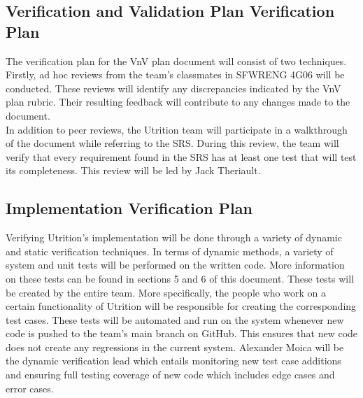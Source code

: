 \documentclass[12pt, titlepage]{article}
\begin{document}
	\subsection{Verification and Validation Plan Verification Plan}
	
	
	
	
	The verification plan for the VnV plan document will consist of two techniques. Firstly, ad hoc reviews from the team's classmates in SFWRENG 4G06 will be conducted. These reviews will identify any discrepancies indicated by the VnV plan rubric. Their resulting feedback will contribute to any changes made to the document.\\
	
	In addition to peer reviews, the Utrition team will participate in a walkthrough of the document while referring to the SRS. During this review, the team will verify that every requirement found in the SRS has at least one test that will test its completeness. This review will be led by Jack Theriault. 
	
	\subsection{Implementation Verification Plan}
	
	
	
	Verifying Utrition's implementation will be done through a variety of dynamic and static verification techniques. In terms of dynamic methods, a variety of system and unit tests will be performed on the written code. More information on these tests can be found in sections 5 and 6 of this document. These tests will be created by the entire team. More specifically, the people who work on a certain functionality of Utrition will be responsible for creating the corresponding test cases. These tests will be automated and run on the system whenever new code is pushed to the team's main branch on GitHub. This ensures that new code does not create any regressions in the current system. Alexander Moica will be the dynamic verification lead which entails monitoring new test case additions and ensuring full testing coverage of new code which includes edge cases and error cases.\\
\end{document}
